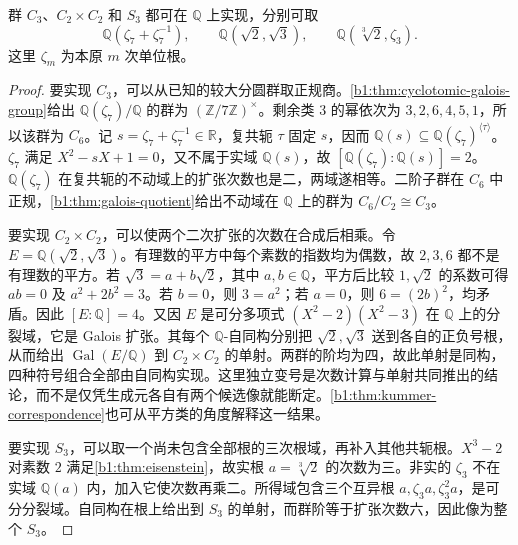 \begin{proposition}\label{b1:prop:inverse-galois-examples}
	群 \(C_3\)、\(C_2\times C_2\) 和 \(S_3\) 都可在 \(\mathbb Q\) 上实现，分别可取
	\[
		\mathbb Q(\zeta_7+\zeta_7^{-1}),\qquad \mathbb Q(\sqrt2,\sqrt3),\qquad \mathbb Q(\sqrt[3]2,\zeta_3).
	\]
	这里 \(\zeta_m\) 为本原 \(m\) 次单位根。
\end{proposition}

\begin{proof}
	要实现 \(C_3\)，可以从已知的较大分圆群取正规商。\cref{b1:thm:cyclotomic-galois-group}给出 \(\mathbb Q(\zeta_7)/\mathbb Q\) 的群为 \((\mathbb Z/7\mathbb Z)^\times\)。剩余类 \(3\) 的幂依次为 \(3,2,6,4,5,1\)，所以该群为 \(C_6\)。记 \(s=\zeta_7+\zeta_7^{-1}\in\mathbb R\)，复共轭 \(\tau\) 固定 \(s\)，因而 \(\mathbb Q(s)\subseteq\mathbb Q(\zeta_7)^{\langle\tau\rangle}\)。\(\zeta_7\) 满足 \(X^2-sX+1=0\)，又不属于实域 \(\mathbb Q(s)\)，故 \([\mathbb Q(\zeta_7):\mathbb Q(s)]=2\)。\(\mathbb Q(\zeta_7)\) 在复共轭的不动域上的扩张次数也是二，两域遂相等。二阶子群在 \(C_6\) 中正规，\cref{b1:thm:galois-quotient}给出不动域在 \(\mathbb Q\) 上的群为 \(C_6/C_2\cong C_3\)。

	要实现 \(C_2\times C_2\)，可以使两个二次扩张的次数在合成后相乘。令 \(E=\mathbb Q(\sqrt2,\sqrt3)\)。有理数的平方中每个素数的指数均为偶数，故 \(2,3,6\) 都不是有理数的平方。若 \(\sqrt3=a+b\sqrt2\)，其中 \(a,b\in\mathbb Q\)，平方后比较 \(1,\sqrt2\) 的系数可得 \(ab=0\) 及 \(a^2+2b^2=3\)。若 \(b=0\)，则 \(3=a^2\)；若 \(a=0\)，则 \(6=(2b)^2\)，均矛盾。因此 \([E:\mathbb Q]=4\)。又因 \(E\) 是可分多项式 \((X^2-2)(X^2-3)\) 在 \(\mathbb Q\) 上的分裂域，它是 Galois 扩张。其每个 \(\mathbb Q\)-自同构分别把 \(\sqrt2,\sqrt3\) 送到各自的正负号根，从而给出 \(\operatorname{Gal}(E/\mathbb Q)\) 到 \(C_2\times C_2\) 的单射。两群的阶均为四，故此单射是同构，四种符号组合全部由自同构实现。这里独立变号是次数计算与单射共同推出的结论，而不是仅凭生成元各自有两个候选像就能断定。\cref{b1:thm:kummer-correspondence}也可从平方类的角度解释这一结果。

	要实现 \(S_3\)，可以取一个尚未包含全部根的三次根域，再补入其他共轭根。\(X^3-2\) 对素数 \(2\) 满足\cref{b1:thm:eisenstein}，故实根 \(a=\sqrt[3]2\) 的次数为三。非实的 \(\zeta_3\) 不在实域 \(\mathbb Q(a)\) 内，加入它使次数再乘二。所得域包含三个互异根 \(a,\zeta_3a,\zeta_3^2a\)，是可分分裂域。自同构在根上给出到 \(S_3\) 的单射，而群阶等于扩张次数六，因此像为整个 \(S_3\)。
\end{proof}

